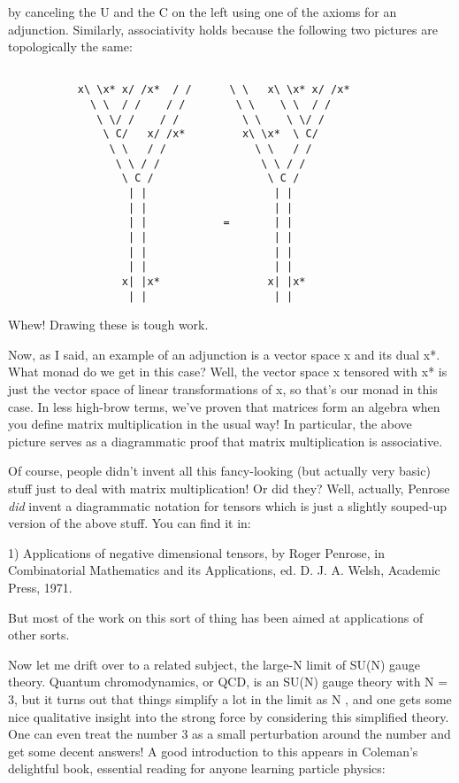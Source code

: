 by canceling the U and the C on the left using one of the
axioms for an adjunction.   Similarly, associativity holds
because the following two pictures are topologically the same:



\begin{verbatim}

           x\ \x* x/ /x*  / /      \ \   x\ \x* x/ /x*
             \ \  / /    / /        \ \    \ \  / /
              \ \/ /    / /          \ \    \ \/ /
               \ C/   x/ /x*         x\ \x*  \ C/
                \ \   / /              \ \   / /
                 \ \ / /                \ \ / /
                  \ C /                  \ C /
                   | |                    | |
                   | |                    | |
                   | |            =       | |
                   | |                    | |
                   | |                    | |
                   | |                    | |
                  x| |x*                 x| |x*
                   | |                    | |

\end{verbatim}
    
Whew!  Drawing these is tough work.  

Now, as I said, an example of an adjunction is a vector space x and
its dual x*.  What monad do we get in this case?  Well, the vector
space x tensored with x* is just the vector space of linear transformations
of x, so that's our monad in this case.  In less high-brow terms,
we've proven that matrices form an algebra when you define matrix
multiplication in the usual way!  In particular, the above picture
serves as a diagrammatic proof that matrix multiplication is associative.

Of course, people didn't invent all this fancy-looking (but actually
very basic) stuff just to deal with matrix multiplication!  Or did
they?  Well, actually, Penrose \emph{did} invent a diagrammatic notation
for tensors which is just a slightly souped-up version of the above
stuff.  You can find it in:

1) Applications of negative dimensional tensors, by Roger Penrose, in 
Combinatorial Mathematics and its Applications, ed. D. J. A. Welsh, 
Academic Press, 1971. 

But most of the work on this sort of thing has been aimed at 
applications of other sorts.  

Now let me drift over to a related subject, the large-N limit of
SU(N) gauge theory.  Quantum chromodynamics, or QCD, is an SU(N) gauge theory
with N = 3, but it turns out that things simplify a lot in the 
limit as N \to  \infty , and one gets some nice qualitative insight into
the strong force by considering this simplified theory.  One can
even treat the number 3 as a small perturbation around the number
\infty  and get some decent answers!   A good introduction to this 
appears in Coleman's delightful book, essential reading for anyone learning
particle physics:

